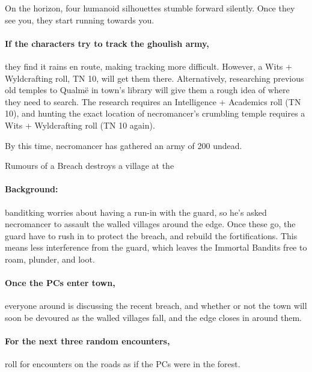 \begin{multicols}{2}
\begin{boxtext}
  On the horizon, four humanoid silhouettes stumble forward silently.  Once they see you, they start running towards you.

\end{boxtext}

\paragraph{If the characters try to track the ghoulish army,}
they find it rains en route, making tracking more difficult.
However, a Wits + Wyldcrafting roll, TN 10, will get them there.
Alternatively, researching previous old temples to Qualm\"{e} in \gls{town}'s library will give them a rough idea of where they need to search.
The research requires an Intelligence + Academics roll (TN 10), and hunting the exact location of \gls{necromancer}'s crumbling temple requires a Wits + Wyldcrafting roll (TN 10 again).

By this time, \gls{necromancer} has gathered an army of 200 undead.

{\squash Rumours of a Breach}%
{ destroys a village at the }%

\paragraph{Background:}
\Gls{banditking} worries about having a run-in with the \gls{guard}, so he's asked \gls{necromancer} to assault the walled villages around the \gls{edge}.
Once these go, the \gls{guard} have to rush in to protect the breach, and rebuild the fortifications.
This means less interference from the \gls{guard}, which leaves the Immortal Bandits free to roam, plunder, and loot.

\paragraph{Once the PCs enter \gls{town},}
everyone around is discussing the recent breach, and whether or not the \gls{town} will soon be devoured as the walled villages fall, and the \gls{edge} closes in around them.

\paragraph{For the next three random encounters,}
roll for encounters on the roads as if the PCs were in the forest.


\end{multicols}
